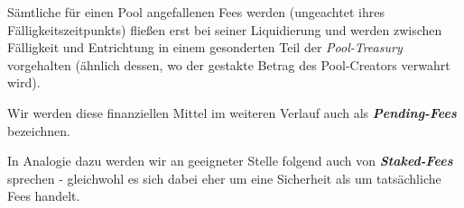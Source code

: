\vspace{0.3cm}

\begin{Praemisse}[Abrechnung]

Sämtliche für einen Pool angefallenen Fees werden (ungeachtet ihres Fälligkeitszeit\-punkts) fließen erst bei seiner Liquidierung und werden zwischen Fälligkeit und Entrichtung in einem gesonderten Teil der \textit{Pool-Treasury} vorgehalten (ähnlich dessen, wo der gestakte Betrag des Pool-Creators verwahrt wird).

\vspace{0.2cm}

Wir werden diese finanziellen Mittel im weiteren Verlauf auch als \textbf{\textit{Pending-Fees}} bezeichnen.

\vspace{0.2cm}

In Analogie dazu werden wir an geeigneter Stelle folgend auch von \textbf{\textit{Staked-Fees}} sprechen - gleichwohl es sich dabei eher um eine Sicherheit als um tatsächliche Fees handelt.

\end{Praemisse}

\vspace{0.5cm}

